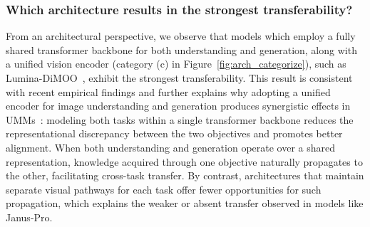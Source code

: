 \subsubsection{Which architecture results in the strongest transferability?} From an architectural perspective, we observe that models which employ a fully shared transformer backbone for both understanding and generation, along with a unified vision encoder (category (c) in Figure~\ref{fig:arch_categorize}), such as Lumina-DiMOO~\cite{xin2025lumina}, exhibit the strongest transferability. This result is consistent with recent empirical findings and further explains why adopting a unified encoder for image understanding and generation produces synergistic effects in UMMs~\cite{wu2025harmonizing, jiao2025unitoken, wu2026liquid}: modeling both tasks within a single transformer backbone reduces the representational discrepancy between the two objectives and promotes better alignment. When both understanding and generation operate over a shared representation, knowledge acquired through one objective naturally propagates to the other, facilitating cross-task transfer. By contrast, architectures that maintain separate visual pathways for each task offer fewer opportunities for such propagation, which explains the weaker or absent transfer observed in models like Janus-Pro.